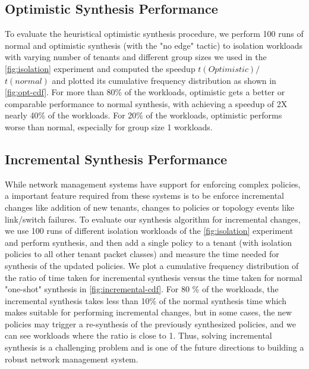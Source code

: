 \subsection{Optimistic Synthesis Performance}
To evaluate the heuristical optimistic synthesis procedure, we perform 100 runs of normal and optimistic synthesis (with the "no edge" tactic) to isolation
 workloads with varying number of tenants and different group sizes 
we used in the \cref{fig:isolation} experiment and computed the
 speedup $t(Optimistic)/$ $t(normal)$ and plotted its cumulative frequency
  distribution as shown in \cref{fig:opt-cdf}. For more than 80\% of the
workloads, optimistic gets a better or comparable performance to normal synthesis, with
achieving a speedup of 2X nearly 40\% of the workloads. For 20\% of the workloads, optimistic
performs worse than normal, especially for group size 1 workloads.

\subsection{Incremental Synthesis Performance}
While network management systems have support for enforcing complex policies, 
a important feature required from these systems is to be enforce incremental changes
like addition of new tenants, changes to policies or topology events like link/switch 
failures. To evaluate our synthesis algorithm for incremental changes, we use 100 runs of 
different isolation workloads of the \cref{fig:isolation} experiment and perform synthesis, and then
add a single policy to a tenant (with isolation policies to all other tenant packet classes) and
measure the time needed for synthesis of the updated policies. We plot a cumulative frequency 
distribution of the ratio of time taken for incremental synthesis versus the time taken for normal 
"one-shot" synthesis in \cref{fig:incremental-cdf}. For 80 \% of the workloads, the incremental 
synthesis takes less than 10\% of the normal synthesis time which makes \Name suitable for 
performing incremental changes, but in some cases, the new policies may trigger a re-synthesis 
of the previously synthesized policies, and we can see workloads where the ratio is close to 1. 
Thus, solving incremental synthesis is a challenging problem and is one of the future directions
to building a robust network management system. 

